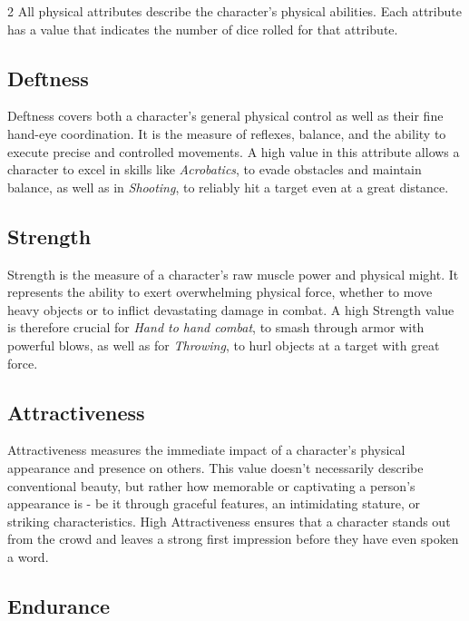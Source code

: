 \begin{multicols}{2}
All physical attributes describe the character's physical abilities. Each attribute has a value that indicates the number of dice rolled for that attribute.

\subsection{Deftness}

Deftness covers both a character's general physical control as well as their fine hand-eye coordination. It is the measure of reflexes, balance, and the ability to execute precise and controlled movements. A high value in this attribute allows a character to excel in skills like \textit{Acrobatics}, to evade obstacles and maintain balance, as well as in \textit{Shooting}, to reliably hit a target even at a great distance.

\subsection{Strength}

Strength is the measure of a character's raw muscle power and physical might. It represents the ability to exert overwhelming physical force, whether to move heavy objects or to inflict devastating damage in combat. A high Strength value is therefore crucial for \textit{Hand to hand combat}, to smash through armor with powerful blows, as well as for \textit{Throwing}, to hurl objects at a target with great force.

\subsection{Attractiveness}

Attractiveness measures the immediate impact of a character's physical appearance and presence on others. This value doesn't necessarily describe conventional beauty, but rather how memorable or captivating a person's appearance is - be it through graceful features, an intimidating stature, or striking characteristics. High Attractiveness ensures that a character stands out from the crowd and leaves a strong first impression before they have even spoken a word.

\subsection{Endurance}


\end{multicols}
